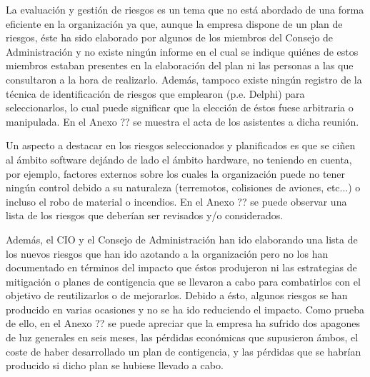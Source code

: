 La evaluación y gestión de riesgos es un tema que no está abordado de
una forma eficiente en la organización ya que, aunque la empresa
dispone de un plan de riesgos, éste ha sido elaborado por algunos de
los miembros del Consejo de Administración y no existe ningún informe
en el cual se indique quiénes de estos miembros estaban presentes en la
elaboración del plan ni las personas a las que consultaron a la hora
de realizarlo. Además, tampoco existe ningún registro de la técnica de
identificación de riesgos que emplearon (p.e. Delphi) para
seleccionarlos, lo cual puede significar que la elección de éstos
fuese arbitraria o manipulada. En el Anexo ?? se muestra el acta de
los asistentes a dicha reunión. 

Un aspecto a destacar en los riesgos seleccionados y planificados es
que se ciñen al ámbito software dejándo de lado el ámbito hardware, no
teniendo en  cuenta, por ejemplo, factores externos sobre los cuales
la organización puede no tener ningún control debido a su naturaleza
(terremotos, colisiones de aviones, etc...) o incluso el robo de material o
incendios. En el Anexo ?? se puede observar una lista de los riesgos
que deberían ser revisados y/o considerados.

Además, el CIO y el Consejo de Administración han ido elaborando una
lista de los nuevos riesgos que han ido azotando a la organización
pero no los han documentado en términos del impacto que éstos
produjeron ni las estrategias de mitigación o planes de contigencia
que se llevaron a cabo para combatirlos con el objetivo de reutilizarlos
o de mejorarlos. Debido a ésto, algunos riesgos se han producido
en varias ocasiones y no se ha ido reduciendo el impacto. Como prueba
de ello, en el Anexo ?? se puede apreciar que la empresa ha sufrido
dos apagones de luz generales en seis meses, las pérdidas económicas
que supusieron ámbos, el coste de haber desarrollado un plan de
contigencia, y las pérdidas que se habrían producido si dicho plan se
hubiese llevado a cabo.

